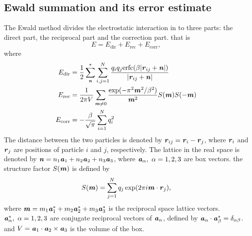 \documentclass[aps,pre,preprint]{revtex4}
\renewcommand{\v}[1]{\textbf{\textit{#1}}}
\begin{document}
\subsection{Ewald summation and its error estimate}
The Ewald method divides the electrostatic interaction in to three
parts: the direct part, the reciprocal part and the correction
part. that is
\begin{equation}
E = E_{\textrm{dir}} + E_{\textrm{rec}} + E_{\textrm{corr}},
\end{equation}
where 
\begin {align}\label{eqn:tmp2}
E_{\textrm{dir}} & = \frac12 \sum^{\ast}_{\v n}
\sum_{i,j = 1}^{N} \frac{q_iq_j \textrm{erfc}(\beta \vert\v{r}_{ij} + \v{n}\vert)}
{\vert\v{r}_{ij} + \v{n}\vert} \\\label{eqn:tmp3}
E_{\textrm{rec}} & = \frac1{2\pi V} \sum_{\v m \neq 0}
\frac{\exp(-\pi^2\v m^2 / \beta^2)}{\v m^2} S(\v m) S(-\v m) \\\label{eqn:tmp4}
 E_{\textrm{corr}}& = -\frac\beta{\sqrt \pi} \sum_{i=1}^N q_i^2
\end {align}
The distance between the two particles is denoted by $\v r_{ij} = \v
r_i - \v r_j$, where $\v r_i$ and $\v r_j$ are positions of particle
$i$ and $j$, respectively.  The lattice in the real space is denoted
by $\v n = n_1 \v a_1 + n_2 \v a_2 + n_3 \v a_3$, where $\v a_\alpha,
\ \alpha=1,2,3$ are box vectors. the structure factor $S(\v m)$ is
defined by
\begin{equation}\label{sm1}
S(\v m) = \sum_{j=1}^N q_j \exp (2 \pi i \v m \cdot \v r_j),
\end{equation}
where $\v m = m_1 \v a_1^\ast + m_2 \v a_2^\ast + m_3 \v a_3^\ast$ is
the reciprocal space lattice vectors. $\v a_\alpha^\ast,\ \alpha = 1,
2, 3$ are conjugate reciprocal vectors of $\v a_\alpha$, defined by
$\v a_\alpha \cdot \v a_\beta^\ast = \delta_{\alpha\beta}$. and $V =
\v a_1 \cdot \v a_2 \times \v a_3$ is the volume of the box.
\end{document}
